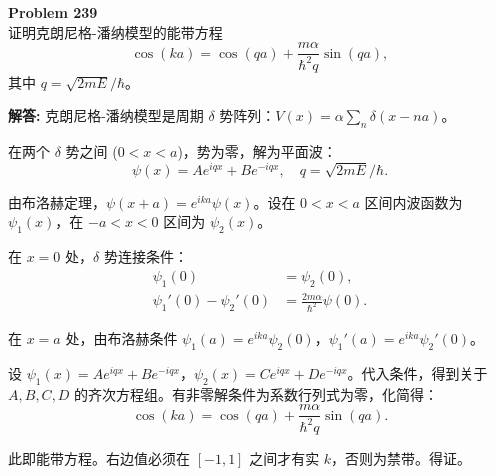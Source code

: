 \documentclass[12pt, a4paper, oneside]{ctexart}
\newenvironment{solution}{\par\noindent\textbf{解答:}\quad}{\par}
\begin{document}
\begin{mdframed}[backgroundcolor=gray!10, linewidth=0pt]
    \textbf{Problem 239} \\
    证明克朗尼格-潘纳模型的能带方程
    \[
    \cos(k a) = \cos(q a) + \frac{m\alpha}{\hbar^2 q} \sin(q a),
    \]
    其中 $q = \sqrt{2mE}/\hbar$。
\end{mdframed}
\begin{solution}
    克朗尼格-潘纳模型是周期 $\delta$ 势阵列：$V(x) = \alpha \sum_n \delta(x - n a)$。
    
    在两个 $\delta$ 势之间 ($0 < x < a$)，势为零，解为平面波：
    \[
    \psi(x) = A e^{i q x} + B e^{-i q x}, \quad q = \sqrt{2mE}/\hbar.
    \]
    
    由布洛赫定理，$\psi(x+a) = e^{i k a} \psi(x)$。设在 $0 < x < a$ 区间内波函数为 $\psi_1(x)$，在 $-a < x < 0$ 区间为 $\psi_2(x)$。
    
    在 $x=0$ 处，$\delta$ 势连接条件：
    \begin{align}
        \psi_1(0) &= \psi_2(0), \\
        \psi_1'(0) - \psi_2'(0) &= \frac{2m\alpha}{\hbar^2} \psi(0).
    \end{align}
    
    在 $x=a$ 处，由布洛赫条件 $\psi_1(a) = e^{i k a} \psi_2(0)$，$\psi_1'(a) = e^{i k a} \psi_2'(0)$。
    
    设 $\psi_1(x) = A e^{i q x} + B e^{-i q x}$，$\psi_2(x) = C e^{i q x} + D e^{-i q x}$。代入条件，得到关于 $A,B,C,D$ 的齐次方程组。有非零解条件为系数行列式为零，化简得：
    \[
    \cos(k a) = \cos(q a) + \frac{m\alpha}{\hbar^2 q} \sin(q a).
    \]
    
    此即能带方程。右边值必须在 $[-1,1]$ 之间才有实 $k$，否则为禁带。得证。
\end{solution}
\end{document}
